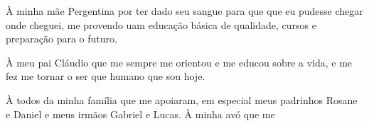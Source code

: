 \begin{agradecimentos}
À minha mãe Pergentina por ter dado seu sangue para que que eu pudesse chegar onde cheguei, me provendo uam educação básica de qualidade, cursos e preparação para o futuro.

À meu pai Cláudio que me sempre me orientou e me educou sobre a vida, e me fez me tornar o ser que humano que sou hoje.

À todos da minha família que me apoiaram, em especial meus padrinhos Rosane e Daniel e meus irmãos Gabriel e Lucas. À minha avó que me 
\end{agradecimentos}
